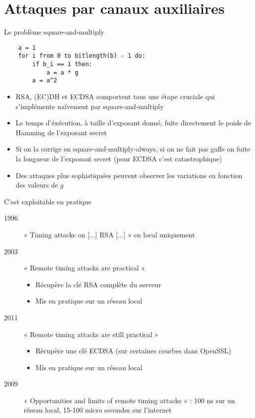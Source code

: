 \documentclass{mpg-ep-slides}
\begin{document}
\section[SCA]{Attaques par canaux auxiliaires}
\tocsect

\begin{frame}[containsverbatim]{Le problème square-and-multiply}
  \begin{Verbatim}
    a = 1
    for i from 0 to bitlength(b) - 1 do:
        if b_i == 1 then:
            a = a * g
        a = a^2
  \end{Verbatim}
  \begin{itemize}
    \item RSA, (EC)DH et ECDSA comportent tous une étape cruciale qui
      s'implémente naïvement par square-and-multiply
    \item Le temps d'éxécution, à taille d'exposant donné, fuite directement
      le poids de Hamming de l'exposant secret
    \item Si on la corrige en square-and-multiply-always, si on ne fait pas
      gaffe on fuite la longueur de l'exposant secret (pour ECDSA c'est
      catastrophique)
    \item Des attaques plus sophistiquées peuvent observer les variations en
      fonction des valeurs de $g$
  \end{itemize}
\end{frame}

\begin{frame}{C'est exploitable en pratique}
  \begin{description}
    \item[1996] « Timing attacks on [...] RSA [...] » en local uniquement
    \item[2003] « Remote timing attacks are practical »
      \begin{itemize}
        \item Récupère la clé RSA complète du serveur
        \item Mis en pratique sur un réseau local
      \end{itemize}
    \item[2011] « Remote timing attacks are still practical »
      \begin{itemize}
        \item Récupère une clé ECDSA (sur certaines courbes dans OpenSSL)
        \item Mis en pratique sur un réseau local
      \end{itemize}
    \item[2009] « Opportunities and limits of remote timing attacks » : 100 ns
      sur un réseau local, 15-100 micro secondes sur l'internet
  \end{description}
\end{frame}
\end{document}

